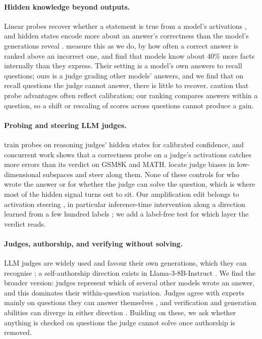 \paragraph{Hidden knowledge beyond outputs.} Linear probes recover whether a statement is true from a model's activations \citep{azaria-mitchell-2023-internal,burns2023discovering,marks2024geometry}, and hidden states encode more about an answer's correctness than the model's generations reveal \citep{kadavath2022language,orgad2025llms}. \citet{gekhman2025insideout} measure this as we do, by how often a correct answer is ranked above an incorrect one, and find that models know about 40\% more facts internally than they express. Their setting is a model's own answers to recall questions; ours is a judge grading other models' answers, and we find that on recall questions the judge cannot answer, there is little to recover. \citet{liu-etal-2023-cognitive} caution that probe advantages often reflect calibration; our ranking compares answers within a question, so a shift or rescaling of scores across questions cannot produce a gain.

\paragraph{Probing and steering LLM judges.} \citet{radharapu-etal-2026-calibrating} train probes on reasoning judges' hidden states for calibrated confidence, and concurrent work \citep{gulati2026auditing} shows that a correctness probe on a judge's activations catches more errors than its verdict on GSM8K and MATH. \citet{xu2026unfair} locate judge biases in low-dimensional subspaces and steer along them. None of these controls for who wrote the answer or for whether the judge can solve the question, which is where most of the hidden signal turns out to sit. Our amplification edit belongs to activation steering \citep{turner2023steering,rimsky-etal-2024-steering,zou2023representation}, in particular inference-time intervention along a direction learned from a few hundred labels \citep{li2023iti}; we add a label-free test for which layer the verdict reads.

\paragraph{Judges, authorship, and verifying without solving.} LLM judges are widely used \citep{zheng2023judging} and favour their own generations, which they can recognise \citep{panickssery2024llm}; a self-authorship direction exists in Llama-3-8B-Instruct \citep{ackerman2025inspection}. We find the broader version: judges represent which of several other models wrote an answer, and this dominates their within-question variation. Judges agree with experts mainly on questions they can answer themselves \citep{krumdick2026nofreelabels,tan2025judgebench}, and verification and generation abilities can diverge in either direction \citep{west2024generative,song2025mind,cobbe2021training,zhang2025reasoning}. Building on these, we ask whether anything is checked on questions the judge cannot solve once authorship is removed.
